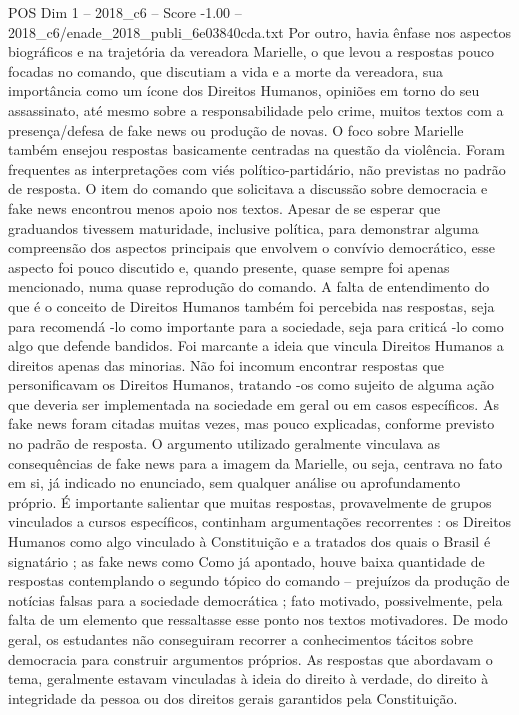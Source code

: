 \begin{textsample}{POS Dim 1 – 2018\_c6 – Score -1.00 – 2018\_c6/enade\_2018\_publi\_6e03840cda.txt}
Por outro, havia ênfase nos aspectos biográficos e na trajetória da vereadora Marielle, o que levou a respostas pouco focadas no comando, que discutiam a vida e a morte da vereadora, sua importância como um ícone dos Direitos Humanos, opiniões em torno do seu assassinato, até mesmo sobre a responsabilidade pelo crime, muitos textos com a presença/defesa de fake news ou produção de novas.
O foco sobre Marielle também ensejou respostas basicamente centradas na questão da violência.
Foram frequentes as interpretações com viés político-partidário, não previstas no padrão de resposta.
O item do comando que solicitava a discussão sobre democracia e fake news encontrou menos apoio nos textos.
Apesar de se esperar que graduandos tivessem maturidade, inclusive política, para demonstrar alguma compreensão dos aspectos principais que envolvem o convívio democrático, esse aspecto foi pouco discutido e, quando presente, quase sempre foi apenas mencionado, numa quase reprodução do comando.
A falta de entendimento do que é o conceito de Direitos Humanos também foi percebida nas respostas, seja para recomendá -lo como importante para a sociedade, seja para criticá -lo como algo que defende bandidos.
Foi marcante a ideia que vincula Direitos Humanos a direitos apenas das minorias.
Não foi incomum encontrar respostas que personificavam os Direitos Humanos, tratando -os como sujeito de alguma ação que deveria ser implementada na sociedade em geral ou em casos específicos.
As fake news foram citadas muitas vezes, mas pouco explicadas, conforme previsto no padrão de resposta.
O argumento utilizado geralmente vinculava as consequências de fake news para a imagem da Marielle, ou seja, centrava no fato em si, já indicado no enunciado, sem qualquer análise ou aprofundamento próprio.
É importante salientar que muitas respostas, provavelmente de grupos vinculados a cursos específicos, continham argumentações recorrentes : os Direitos Humanos como algo vinculado à Constituição e a tratados dos quais o Brasil é signatário ; as fake news como Como já apontado, houve baixa quantidade de respostas contemplando o segundo tópico do comando – prejuízos da produção de notícias falsas para a sociedade democrática ; fato motivado, possivelmente, pela falta de um elemento que ressaltasse esse ponto nos textos motivadores.
De modo geral, os estudantes não conseguiram recorrer a conhecimentos tácitos sobre democracia para construir argumentos próprios.
As respostas que abordavam o tema, geralmente estavam vinculadas à ideia do direito à verdade, do direito à integridade da pessoa ou dos direitos gerais garantidos pela Constituição.

\end{textsample}
